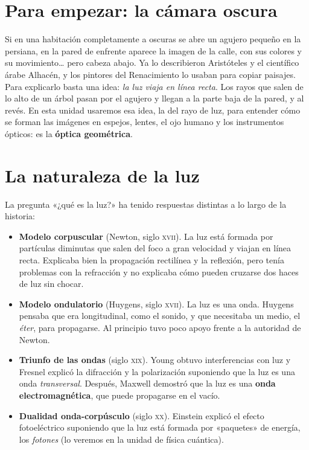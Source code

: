 
\section*{Para empezar: la cámara oscura}

Si en una habitación completamente a oscuras se abre un agujero pequeño en la persiana, en la pared de enfrente aparece
la imagen de la calle, con sus colores y su movimiento\ldots{} pero cabeza abajo. Ya lo describieron Aristóteles y el
científico árabe Alhacén, y los pintores del Renacimiento lo usaban para copiar paisajes. Para explicarlo basta una idea:
\emph{la luz viaja en línea recta}. Los rayos que salen de lo alto de un árbol pasan por el agujero y llegan a la parte baja
de la pared, y al revés. En esta unidad usaremos esa idea, la del rayo de luz, para entender cómo se forman las imágenes en
espejos, lentes, el ojo humano y los instrumentos ópticos: es la \textbf{óptica geométrica}.

\section{La naturaleza de la luz}\label{sec:opt-naturaleza}

La pregunta «¿qué es la luz?» ha tenido respuestas distintas a lo largo de la historia:
\begin{itemize}
    \item \textbf{Modelo corpuscular} (Newton, siglo \textsc{xvii}). La luz está formada por partículas diminutas que
    salen del foco a gran velocidad y viajan en línea recta. Explicaba bien la propagación rectilínea y la reflexión, pero
    tenía problemas con la refracción y no explicaba cómo pueden cruzarse dos haces de luz sin chocar.
    \item \textbf{Modelo ondulatorio} (Huygens, siglo \textsc{xvii}). La luz es una onda. Huygens pensaba que era
    longitudinal, como el sonido, y que necesitaba un medio, el \emph{éter}, para propagarse. Al principio tuvo poco apoyo
    frente a la autoridad de Newton.
    \item \textbf{Triunfo de las ondas} (siglo \textsc{xix}). Young obtuvo interferencias con luz y Fresnel explicó la
    difracción y la polarización suponiendo que la luz es una onda \emph{transversal}. Después, Maxwell demostró que la luz
    es una \textbf{onda electromagnética}, que puede propagarse en el vacío.
    \item \textbf{Dualidad onda-corpúsculo} (siglo \textsc{xx}). Einstein explicó el efecto fotoeléctrico suponiendo que la
    luz está formada por «paquetes» de energía, los \emph{fotones} (lo veremos en la unidad de física cuántica).
\end{itemize}

